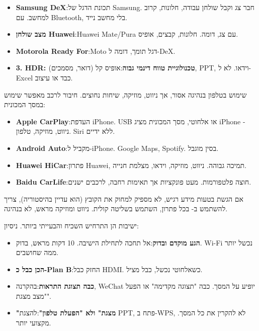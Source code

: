 \begin{itemize}
  \item \textbf{Samsung DeX}:תכונת הדגל של Samsung. חבר צג וקבל שולחן עבודה, חלונות, קרוב למחשב. עם Bluetooth, בלי מחשב נייד.
  \item \textbf{מצב שולחן Huawei}:Huawei Mate/Pura עם צג, דומה. חלונות, קבצים, אופיס.
  \item \textbf{Motorola Ready For}:Moto דגל תומך, דומה ל-DeX.
  \item \textbf{3. HDR: טכנולוגיית טווח דינמי גבוה}:אופיס קל (דואר, מסמכים), PPT, וידאו. לא ל-Excel כבד או עיצוב.
\end{itemize}


שימוש בטלפון בנהיגה אסור, אך ניווט, מוזיקה, שיחות נחוצים. חיבור לרכב מאפשר שימוש במסך המכונית:

\begin{itemize}
  \item \textbf{Apple CarPlay}:העדפת iPhone. USB או אלחוטי, מסך המכונית מציג iPhone - ניווט, מוזיקה, טלפון. Siri ללא ידיים.
  \item \textbf{Android Auto}:מקביל ל-iPhone. Google Maps, Spotify. בסין מוגבל.
  \item \textbf{Huawei HiCar}:פתרון Huawei, תמיכה גבוהה. ניווט, מוזיקה, וידאו, מצלמת חנייה.
  \item \textbf{Baidu CarLife}:חוצה פלטפורמות. מעט פונקציות אך תאימות רחבה, לרכבים ישנים.
\end{itemize}

\begin{tcbwarn}{אם הגשת בטעות מידע רגיש, לא מספיק למחוק את הקובץ (הוא עדיין בהיסטוריה), צריך להשתמש ב-}
בכל פתרון, השתמש בשליטה קולית. ניווט ומוזיקה מראש, לא בנהיגה.

\end{tcbwarn}


ישיבות הן התרחיש השכיח והבעייתי ביותר. ניסיון:

\begin{itemize}
  \item \textbf{הגע מוקדם ובדוק}:אל תחכה לתחילת הישיבה. 10 דקות מראש, בדוק. Wi-Fi נכשל יותר ממה שחושבים.
  \item \textbf{הכן כבל כ-Plan B}:החזק כבל HDMI. כשאלחוטי נכשל, כבל מציל.
  \item \textbf{כבה תצוגת התראות}:בהקרנה, WeChat יופיע על המסך. כבה "תצוגה מקדימה" או הפעל "מצב מצגת".
  \item \textbf{"מצגת" ולא "הפעלת טלפון"}:להצגת PPT, פתח ב-WPS, לא להקרין את כל המסך. מקצועי יותר.
\end{itemize}

